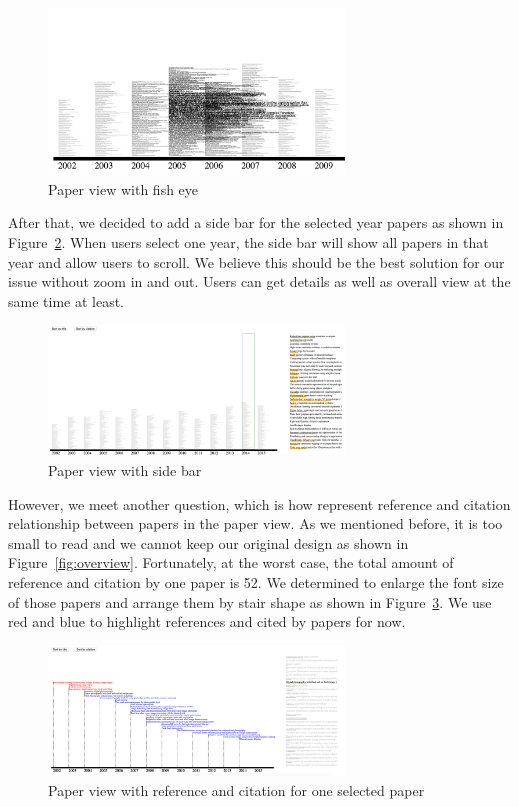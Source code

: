\begin{figure}[ht]			
	\centering
	\includegraphics[width=0.7\textwidth]{paper_view_fisheye}
	\caption{Paper view with fish eye}
	\label{fig:pv_fisheye}
\end{figure} 

After that, we decided to add a side bar for the selected year papers as shown in Figure~\ref{fig:pv_side_bar}. When users select one year, the side bar will show all papers in that year and allow users to scroll. We believe this should be the best solution for our issue without zoom in and out. Users can get details as well as overall view at the same time at least.

\begin{figure}[h]			
	\centering
	\includegraphics[width=0.7\textwidth]{paper_view_with_side_bar}
	\caption{Paper view with side bar}
	\label{fig:pv_side_bar}
\end{figure} 

However, we meet another question, which is how represent reference and citation relationship between papers in the paper view. As we mentioned before, it is too small to read and we cannot keep our original design as shown in Figure~\ref{fig:overview}. Fortunately, at the worst case, the total amount of reference and citation by one paper is 52. We determined to enlarge the font size of those papers and arrange them by stair shape as shown in Figure~\ref{fig:pv_reference_citation}. We use red and blue to highlight references and cited by papers for now.

\begin{figure}[ht]			
	\centering
	\includegraphics[width=0.7\textwidth]{paper_view_reference_relationship}
	\caption{Paper view with reference and citation for one selected paper}
	\label{fig:pv_reference_citation}
\end{figure} 

